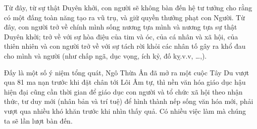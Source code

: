 Từ đây, từ sự thật Duyên khởi, con người sẽ không bàn đến hệ tư tưởng cho rằng có một đấng toàn năng tạo ra vũ trụ, và giữ quyền thưởng phạt con Người. Từ đây, con người trở về chính mình sống nương tựa mình và nương tựa sự thật Duyên khởi; trở về với sự hòa điệu của tim và óc, của cá nhân và xã hội, của thiên nhiên và con người trở về với sự tách rời khỏi các nhân tố gây ra khổ đau cho mình và người (như chấp ngã, dục vọng, ích kỷ, đố kỵ.v.v, \ldots,).

Đấy là một số ý niệm tổng quát, Ngô Thừa Ân đã mở ra một cuộc Tây Du vượt qua 81 ma nạn trước khi đặt chân tới Lôi Âm tự, thì nền văn hóa giáo dục hậu hiện đại cũng cần thời gian để giáo dục con người và tổ chức xã hội theo nhận thức, tư duy mới (nhân bản và trí tuệ) để hình thành nếp sống văn hóa mới, phải vượt qua nhiều khó khăn trước khi nhìn thấy quả. Có nhiều việc làm mà chúng ta sẽ lần lượt bàn đến.

